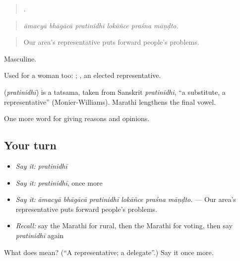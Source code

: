 \begin{quote}
     .
\end{quote}

\begin{quote}
\emph{āmacyā bhāgācā pratinidhī lokāñce praśna māṇḍto.}
\end{quote}

\begin{quote}
Our area's representative puts forward people's problems.
\end{quote}

Masculine.

Used for a woman too:    ; , an elected representative.

\begin{cousinweb}
\textbf{} (\emph{pratinidhī}) is a tatsama, taken from Sanskrit \emph{pratinidhi}, \textquotedblleft{}a substitute, a representative\textquotedblright{} (Monier-Williams). Marathi lengthens the final vowel.
\end{cousinweb}

\begin{grammarlens}[title={What you've built}]
One more word for giving reasons and opinions.
\end{grammarlens}

\subsection*{Your turn}
\begin{itemize}
\raggedright
  \item \emph{Say it:} \emph{pratinidhī}
  \item \emph{Say it:} \emph{pratinidhī}, once more
  \item \emph{Say it:} \emph{āmacyā bhāgācā pratinidhī lokāñce praśna māṇḍto.} — Our area's representative puts forward people's problems.
  \item \emph{Recall:} say the Marathi for rural, then the Marathi for voting, then say \emph{pratinidhī} again
\end{itemize}

\begin{tcolorbox}[breakable,colback=teal!4,colframe=teal!35!black,title={Before you move on}]
What does  mean? (\textquotedblleft{}A representative; a delegate\textquotedblright{}.) Say it once more.
\end{tcolorbox}
